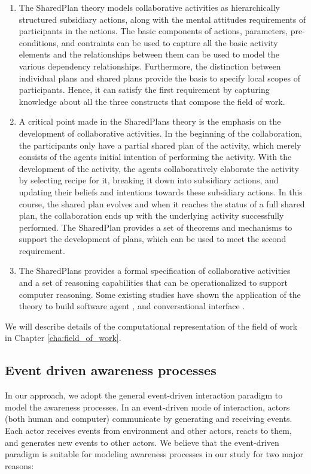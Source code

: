 \begin{enumerate}
   \item The SharedPlan theory models collaborative activities as hierarchically structured subsidiary actions, along with the mental attitudes requirements of participants in the actions. The basic components of actions, parameters, pre-conditions, and contraints can be used to capture all the basic activity elements and the relationships between them can be used to model the various dependency relationships. Furthermore, the distinction between individual plans and shared plans provide the basis to specify local scopes of participants. Hence, it can satisfy the first requirement by capturing knowledge about all the three constructs that compose the field of work.
   \item A critical point made in the SharedPlans theory is the emphasis on the development of collaborative activities. In the beginning of the collaboration, the participants only have a partial shared plan of the activity, which merely consists of the agents initial intention of performing the activity. With the development of the activity, the agents collaboratively elaborate the activity by selecting recipe for it, breaking it down into subsidiary actions, and updating their beliefs and intentions towards these subsidiary actions. In this course, the shared plan evolves and when it reaches the status of a full shared plan, the collaboration ends up with the underlying activity successfully performed. The SharedPlan provides a set of theorems and mechanisms to support the development of plans, which can be used to meet the second requirement.
   \item The SharedPlans provides a formal specification of collaborative activities and a set of reasoning capabilities that can be operationalized to support computer reasoning. Some existing studies have shown the application of the theory to build software agent \cite{springerlink:10.1023/A:1008204020038}, and conversational interface \cite{Cai2005}.  
\end{enumerate}
We will describe details of the computational representation of the field of work in Chapter \ref{cha:field_of_work}.

\subsection{Event driven awareness processes} %
\label{sub:event_driven_awareness_processes}
In our approach, we adopt the general event-driven interaction paradigm \cite{Etzion2010} to model the awareness processes. In an event-driven mode of interaction, actors (both human and computer) communicate by generating and receiving events. Each actor receives events from environment and other actors, reacts to them, and generates new events to other actors. We believe that the event-driven paradigm is suitable for modeling awareness processes in our study for two major reasons:


